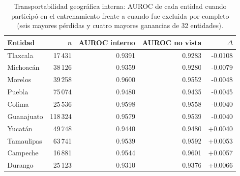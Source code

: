 
\begin{table}[htbp]
\centering
\small
\caption{Transportabilidad geográfica interna: AUROC de cada entidad cuando
participó en el entrenamiento frente a cuando fue excluida por completo (seis
mayores pérdidas y cuatro mayores ganancias de 32 entidades).}
\label{tab:loeo}
\begin{tabular}{l r r r r}
\toprule
Entidad & $n$ & AUROC interno & AUROC no vista & $\Delta$ \\
\midrule
Tlaxcala & 17\,431 & 0.9391 & 0.9283 & -0.0108 \\
Michoacán & 38\,126 & 0.9359 & 0.9280 & -0.0079 \\
Morelos & 39\,258 & 0.9600 & 0.9552 & -0.0048 \\
Puebla & 75\,074 & 0.9480 & 0.9435 & -0.0045 \\
Colima & 25\,536 & 0.9598 & 0.9558 & -0.0040 \\
Guanajuato & 118\,324 & 0.9579 & 0.9539 & -0.0040 \\
\midrule
Yucatán & 49\,748 & 0.9440 & 0.9480 & +0.0040 \\
Tamaulipas & 63\,741 & 0.9539 & 0.9592 & +0.0053 \\
Campeche & 16\,881 & 0.9544 & 0.9601 & +0.0057 \\
Durango & 25\,123 & 0.9310 & 0.9376 & +0.0066 \\
\bottomrule
\end{tabular}
\end{table}
